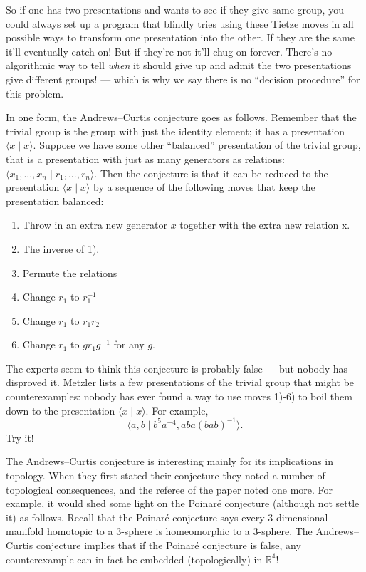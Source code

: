 \documentclass{article}
\def\tightlist{}
\begin{document}
So if one has two presentations and wants to see if they give same
group, you could always set up a program that blindly tries using these
Tietze moves in all possible ways to transform one presentation into the
other. If they are the same it'll eventually catch on! But if they're
not it'll chug on forever. There's no algorithmic way to tell
\emph{when} it should give up and admit the two presentations give
different groups! --- which is why we say there is no ``decision
procedure'' for this problem.

In one form, the Andrews--Curtis conjecture goes as follows. Remember
that the trivial group is the group with just the identity element; it
has a presentation \(\langle x \mid x \rangle\). Suppose we have some
other ``balanced'' presentation of the trivial group, that is a
presentation with just as many generators as relations:
\(\langle x_1,...,x_n \mid r_1,...,r_n \rangle\). Then the conjecture is
that it can be reduced to the presentation \(\langle x \mid x \rangle\)
by a sequence of the following moves that keep the presentation
balanced:

\begin{enumerate}
\def\labelenumi{\arabic{enumi})}
\tightlist
\item
  Throw in an extra new generator \(x\) together with the extra new
  relation x.
\item
  The inverse of 1).
\item
  Permute the relations
\item
  Change \(r_1\) to \(r_1^{-1}\)
\item
  Change \(r_1\) to \(r_1r_2\)
\item
  Change \(r_1\) to \(gr_1g^{-1}\) for any \(g\).
\end{enumerate}

The experts seem to think this conjecture is probably false --- but
nobody has disproved it. Metzler lists a few presentations of the
trivial group that might be counterexamples: nobody has ever found a way
to use moves 1)-6) to boil them down to the presentation
\(\langle x \mid x \rangle\). For example,
\[\langle a, b \mid b^5a^{-4}, aba(bab)^{-1}\rangle.\] Try it!

The Andrews--Curtis conjecture is interesting mainly for its implications
in topology. When they first stated their conjecture they noted a number
of topological consequences, and the referee of the paper noted one
more. For example, it would shed some light on the Poinar\'e conjecture
(although not settle it) as follows. Recall that the Poinar\'e conjecture
says every \(3\)-dimensional manifold homotopic to a 3-sphere is
homeomorphic to a 3-sphere. The Andrews--Curtis conjecture implies that
if the Poinar\'e conjecture is false, any counterexample can in fact be
embedded (topologically) in \(\mathbb{R}^4\)!
\end{document}
